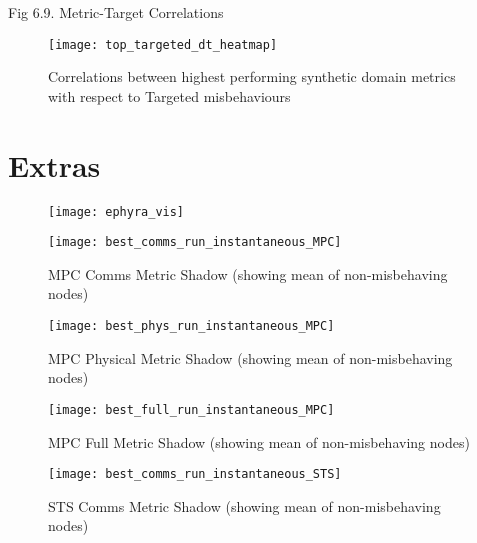 \documentclass[aspectratio=169]{beamer}
\begin{document}
\begin{frame}{Fig 6.9. Metric-Target Correlations}
	\begin{figure}
		\centering
		\texttt{[image: top\_targeted\_dt\_heatmap]}
		\caption{Correlations between highest performing synthetic domain metrics with respect to Targeted misbehaviours}
		\label{fig:top_targeted_dt_heatmap}
	\end{figure}
\end{frame}

\section{Extras}

\begin{frame}
	\begin{figure}
		\texttt{[image: ephyra\_vis]}
	\end{figure}
\end{frame}



\begin{frame}\begin{figure}[h]
	\centering
	\texttt{[image: best\_comms\_run\_instantaneous\_MPC]}
	\caption{MPC Comms Metric Shadow (showing mean of non-misbehaving nodes)}
	\label{fig:comms_instantaneous_mpc}
\end{figure}\end{frame}

\begin{frame}\begin{figure}[h]
	\centering
	\texttt{[image: best\_phys\_run\_instantaneous\_MPC]}
	\caption{MPC Physical Metric Shadow (showing mean of non-misbehaving nodes)}
	\label{fig:phys_instantaneous_mpc}
\end{figure}\end{frame}

\begin{frame}\begin{figure}[h]
	\centering
	\texttt{[image: best\_full\_run\_instantaneous\_MPC]}
	\caption{MPC Full Metric Shadow (showing mean of non-misbehaving nodes)}
	\label{fig:full_instantaneous_mpc}
\end{figure}\end{frame}


\begin{frame}\begin{figure}[h]
	\centering
	\texttt{[image: best\_comms\_run\_instantaneous\_STS]}
	\caption{STS Comms Metric Shadow (showing mean of non-misbehaving nodes)}
	\label{fig:comms_instantaneous_sts}
\end{figure}\end{frame}
\end{document}

